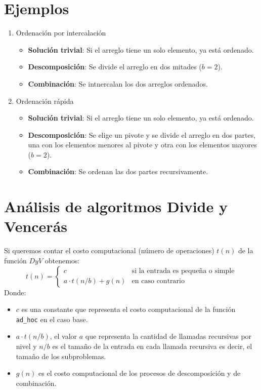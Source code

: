 \section{Ejemplos}
\begin{enumerate}
    \item Ordenación por intercalación
    \begin{itemize}
        \item \textbf{Solución trivial}: Si el arreglo tiene un solo elemento, ya está ordenado.
        \item \textbf{Descomposición}: Se divide el arreglo en dos mitades ($b=2$).
        \item \textbf{Combinación}: Se intnercalan los dos arreglos ordenados.
    \end{itemize}
    \item Ordenación rápida
    \begin{itemize}
        \item \textbf{Solución trivial}: Si el arreglo tiene un solo elemento, ya está ordenado.
        \item \textbf{Descomposición}: Se elige un pivote y se divide el arreglo en dos partes, una con los elementos menores al pivote y otra con los elementos mayores ($b=2$).
        \item \textbf{Combinación}: Se ordenan las dos partes recursivamente.
    \end{itemize}
\end{enumerate}

\section{Análisis de algoritmos Divide y Vencerás}
Si queremos contar el costo computacional (número de operaciones) $t(n)$ de la función $DyV$ obtenemos:
\begin{equation*}
    t(n) = 
    \begin{cases}
        c & \text{si la entrada es pequeña o simple} \\
        a \cdot t(n/b) + g(n) & \text{en caso contrario}
    \end{cases}
\end{equation*}
Donde:
\begin{itemize}
    \item $c$ es una constante que representa el costo computacional de la función \texttt{ad\_hoc} en el caso base.
    \item $a \cdot t(n/b)$, el valor $a$ que representa la cantidad de llamadas recursivas por nivel y $n/b$ es el tamaño de la entrada en cada llamada recursiva es decir, el tamaño de los subproblemas.
    \item $g(n)$ es el costo computacional de los procesos de descomposición y de combinación.
\end{itemize}

